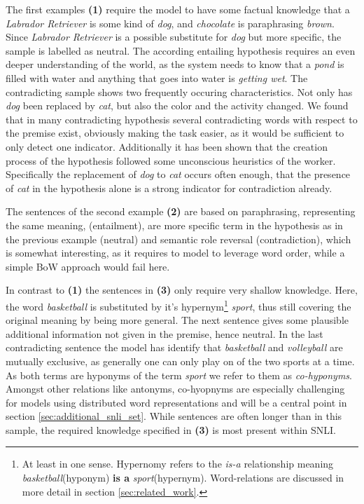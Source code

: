 The first examples \textbf{(1)} require the model to have some factual knowledge that a \textit{Labrador Retriever} is some kind of \textit{dog}, and \textit{chocolate} is paraphrasing \textit{brown}. Since \textit{Labrador Retriever} is a possible substitute for \textit{dog} but more specific, the sample is labelled as neutral. The according entailing hypothesis requires an even deeper understanding of the world, as the system needs to know that a \textit{pond} is filled with water and anything that goes into water is \textit{getting wet}. The contradicting sample shows two frequently occuring characteristics. Not only has \textit{dog} been replaced by \textit{cat}, but also the color and the activity changed. We found that in many contradicting hypothesis several contradicting words with respect to the premise exist, obviously making the task easier, as it would be sufficient to only detect one indicator. Additionally it has been shown that the creation process of the hypothesis followed some unconscious heuristics of the worker\citep{gururangan2018annotation}. Specifically the replacement of \textit{dog} to \textit{cat} occurs often enough, that the presence of \textit{cat} in the hypothesis alone is a strong indicator for contradiction already. 


The sentences of the second example \textbf{(2)} are based on paraphrasing, representing the same meaning, (entailment), are more specific term in the hypothesis as in the previous example (neutral) and semantic role reversal (contradiction),  which is somewhat interesting, as it requires to model to leverage word order, while a simple \ac{BoW} approach would fail here.


In contrast to \textbf{(1)} the sentences in \textbf{(3)} only require very shallow knowledge. Here, the word \textit{basketball} is substituted by it's hypernym\footnote{At least in one sense. Hypernomy refers to the \textit{is-a} relationship meaning \textit{basketball}(hyponym) \textbf{is a} \textit{sport}(hypernym). Word-relations are discussed in more detail in section \ref{sec:related_work}.} \textit{sport}, thus still covering the original meaning by being more general. The next sentence gives some plausible additional information not given in the premise, hence neutral. In the last contradicting sentence the model has identify that \textit{basketball} and \textit{volleyball} are mutually exclusive, as generally one can only play on of the two sports at a time. As both terms are hyponyms of the term \textit{sport} we refer to them as \textit{co-hyponyms}. Amongst other relations like antonyms, co-hyopnyms are especially challenging for models using distributed word representations and will be a central point in section \ref{sec:additional_snli_set}. While sentences are often longer than in this sample, the required knowledge specified in \textbf{(3)} is most present within \ac{SNLI}.

